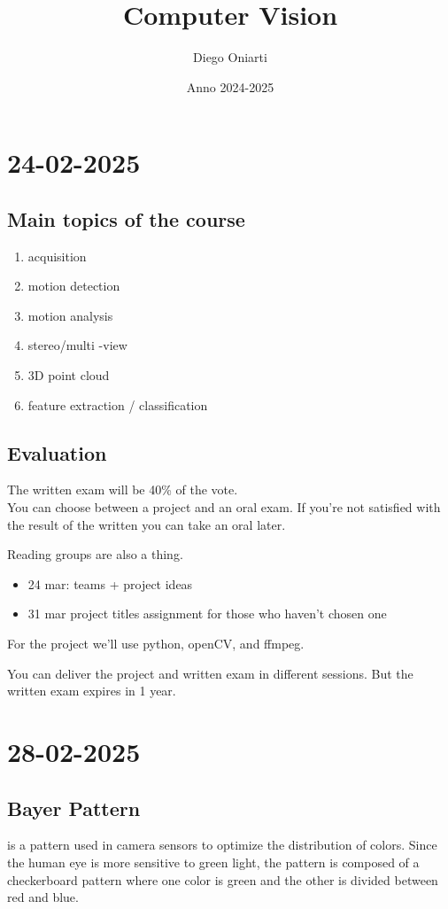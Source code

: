 \documentclass{article}
\title{Computer Vision}
\author{Diego Oniarti}
\date{Anno 2024-2025}
\begin{document}
\maketitle
\tableofcontents

\newpage
\section{24-02-2025}
\subsection*{Main topics of the course}
\begin{enumerate}
    \item acquisition
    \item motion detection
    \item motion analysis
    \item stereo/multi -view
    \item 3D point cloud
    \item feature extraction / classification
\end{enumerate}

\subsection*{Evaluation}
The written exam will be 40\% of the vote.\\
You can choose between a project and an oral exam. If you're not satisfied with the result of the written you can take an oral later.

Reading groups are also a thing.

\begin{itemize}
    \item 24 mar: teams + project ideas
    \item 31 mar project titles assignment for those who haven't chosen one
\end{itemize}

For the project we'll use python, openCV, and ffmpeg.

You can deliver the project and written exam in different sessions. But the written exam expires in 1 year.

\newpage
\section{28-02-2025}
\subsection*{Bayer Pattern} is a pattern used in camera sensors to optimize the distribution of colors. Since the human eye is more sensitive to green light, the pattern is composed of a checkerboard pattern where one color is green and the other is divided between red and blue.
\end{document}
